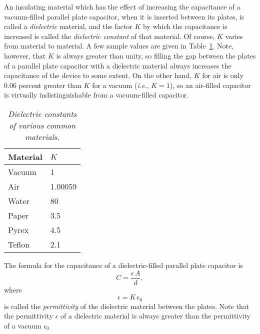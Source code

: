 An insulating
material which has the effect of increasing the capacitance of a vacuum-filled parallel
plate capacitor, when it is inserted between its plates, is called a
{\em dielectric}\/ material, and the factor $K$ by which the capacitance is
increased is called the {\em dielectric constant}\/ of that material. Of course, $K$ varies from material to material. A few
sample values are given in Table~\ref{t6.1}. Note, however, that $K$ is always greater
than unity, so filling the gap between the plates of a parallel plate
capacitor with a dielectric material always increases the capacitance of the
device to some extent. On the other hand, $K$ for air is only $0.06$ percent greater
than $K$ for a vacuum ({\em i.e.}, $K=1$), so an air-filled capacitor is virtually
indistinguishable from a vacuum-filled capacitor.
\begin{table}
\centering
\begin{tabular}{ll}\hline
Material & $K$ \\ \hline
Vacuum &1  \\
Air & 1.00059 \\
Water & 80\\
Paper & 3.5 \\
Pyrex & 4.5\\
Teflon & 2.1\\
\hline
\end{tabular}
\caption{\em Dielectric constants of various common materials.}\label{t6.1}
\end{table}

The formula for the capacitance of a dielectric-filled parallel plate capacitor
is
\begin{equation}\label{ecap}
C = \frac{\epsilon\,A}{d},
\end{equation}
where
\begin{equation}
\epsilon = K\,\epsilon_0
\end{equation}
is called the {\em permittivity} of the dielectric material between the plates.
Note that the permittivity $\epsilon$ of a dielectric 
material is always greater than
the permittivity of a vacuum $\epsilon_0$

